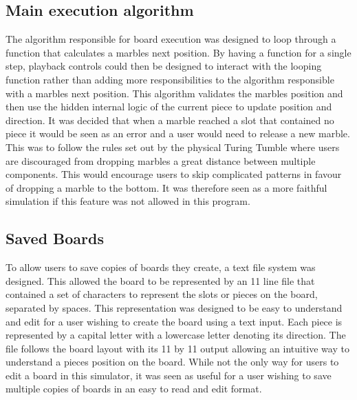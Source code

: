 \documentclass{l4proj}
\begin{document}
\subsection{Main execution algorithm}
The algorithm responsible for board execution was designed to loop through a function that calculates a marbles next position. By having a function for a single step, playback controls could then be designed to interact with the looping function rather than adding more responsibilities to the algorithm responsible with a marbles next position. This algorithm validates the marbles position and then use the hidden internal logic of the current piece to update position and direction. It was decided that when a marble reached a slot that contained no piece it would be seen as an error and a user would need to release a new marble. This was to follow the rules set out by the physical Turing Tumble where users are discouraged from dropping marbles a great distance between multiple components. This would encourage users to skip complicated patterns in favour of dropping a marble to the bottom. It was therefore seen as a more faithful simulation if this feature was not allowed in this program. 


\subsection{Saved Boards}
To allow users to save copies of boards they create, a text file system was designed. This allowed the board to be represented by an 11 line file that contained a set of characters to represent the slots or pieces on the board, separated by spaces. This representation was designed to be easy to understand and edit for a user wishing to create the board using a text input. Each piece is represented by a capital letter with a lowercase letter denoting its direction. The file follows the board layout with its 11 by 11 output allowing an intuitive way to understand a pieces position on the board. While not the only way for users to edit a board in this simulator, it was seen as useful for a user wishing to save multiple copies of boards in an easy to read and edit format.
\end{document}
